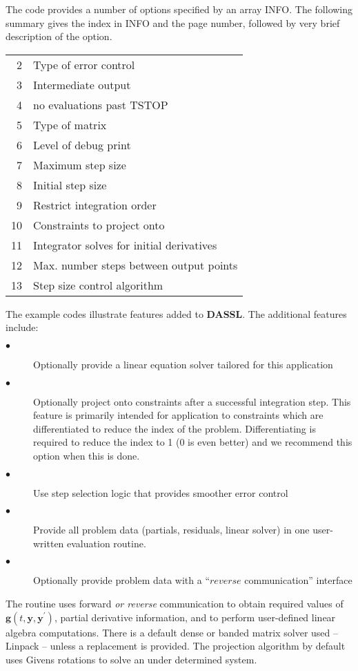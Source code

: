 \documentclass[twoside]{MATH77}
\begin{document}
The code provides a number of options specified by an array INFO.  The
following summary gives the index in INFO and the page number,
followed by very brief description of the option.

\begin{tabular}{rl}
  2 \pageref{info2}& Type of error control\\
  3 \pageref{info3} & Intermediate output\\
  4 \pageref{info4} & no evaluations past TSTOP\\
  5 \pageref{info5} & Type of matrix\\
  6 \pageref{info6} & Level of debug print\\
  7 \pageref{info7} & Maximum step size\\
  8 \pageref{info8} & Initial step size\\
  9 \pageref{info9} & Restrict integration order\\
  10 \pageref{info10} & Constraints to project onto\\
  11 \pageref{info11} & Integrator solves for initial derivatives\\
  12 \pageref{info12} & Max. number steps between output points\\
  13 \pageref{info13} & Step size control algorithm\\
\end{tabular}

The example codes illustrate features added to \textbf{DASSL}. The
additional features include:
\begin{description}
\item[$\bullet$] Optionally provide a linear equation solver tailored for
  this application
\item[$\bullet$] Optionally project onto constraints after a successful
  integration step.  This feature is primarily intended for
  application to constraints which are differentiated to reduce the
  index of the problem.  Differentiating is required to reduce the
  index to 1 (0 is even better) and we recommend this option when this
  is done.
\item[$\bullet$] Use step selection logic that provides smoother error control
\item[$\bullet$] Provide all problem data (partials, residuals, linear solver)
  in one user-written evaluation routine.
\item[$\bullet$] Optionally provide problem data with a
  ``$reverse$ communication'' interface
\end{description}
The routine uses forward \emph{or reverse} communication to obtain required
values of $\mathbf{g}(t,\mathbf{y},\mathbf{y}^{\prime})$, partial derivative
information, and to perform user-defined linear algebra computations.  There
is a default dense or banded matrix solver used -- Linpack
\cite{Dongarra:1979:LUG} -- unless a replacement is provided.  The projection algorithm
by default uses Givens rotations to solve an under determined system.
\end{document}
